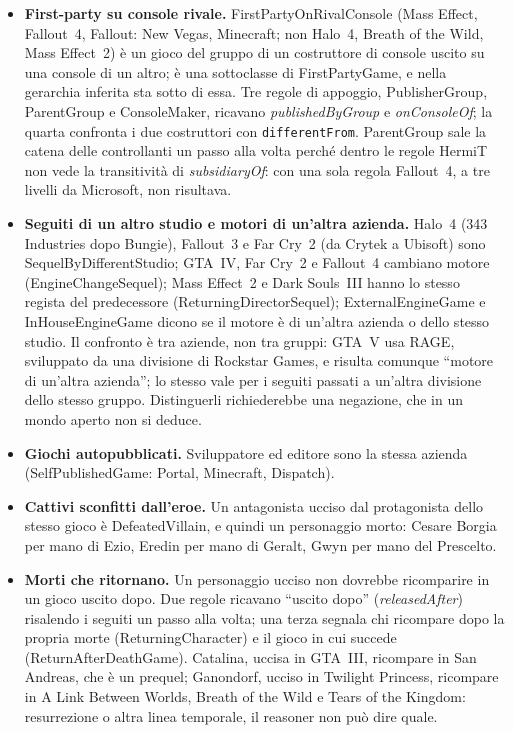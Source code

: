 \documentclass[10pt,a4paper]{article}
\newcommand{\cls}[1]{\textsf{#1}}
\newcommand{\prop}[1]{\textit{#1}}
\begin{document}
\begin{itemize}
  \item \textbf{First-party su console rivale.} \cls{FirstPartyOnRivalConsole} (Mass Effect, Fallout~4, Fallout: New Vegas, Minecraft; non Halo~4, Breath of the Wild, Mass Effect~2) è un gioco del gruppo di un costruttore di console uscito su una console di un altro; è una sottoclasse di \cls{FirstPartyGame}, e nella gerarchia inferita sta sotto di essa. Tre regole di appoggio, \textsf{PublisherGroup}, \textsf{ParentGroup} e \textsf{ConsoleMaker}, ricavano \prop{publishedByGroup} e \prop{onConsoleOf}; la quarta confronta i due costruttori con \texttt{differentFrom}. \textsf{ParentGroup} sale la catena delle controllanti un passo alla volta perché dentro le regole HermiT non vede la transitività di \prop{subsidiaryOf}: con una sola regola Fallout~4, a tre livelli da Microsoft, non risultava.
  \item \textbf{Seguiti di un altro studio e motori di un'altra azienda.} Halo~4 (343 Industries dopo Bungie), Fallout~3 e Far Cry~2 (da Crytek a Ubisoft) sono \cls{SequelByDifferentStudio}; GTA~IV, Far Cry~2 e Fallout~4 cambiano motore (\cls{EngineChangeSequel}); Mass Effect~2 e Dark Souls~III hanno lo stesso regista del predecessore (\cls{ReturningDirectorSequel}); \cls{ExternalEngineGame} e \cls{InHouseEngineGame} dicono se il motore è di un'altra azienda o dello stesso studio. Il confronto è tra aziende, non tra gruppi: GTA~V usa RAGE, sviluppato da una divisione di Rockstar Games, e risulta comunque ``motore di un'altra azienda''; lo stesso vale per i seguiti passati a un'altra divisione dello stesso gruppo. Distinguerli richiederebbe una negazione, che in un mondo aperto non si deduce.
  \item \textbf{Giochi autopubblicati.} Sviluppatore ed editore sono la stessa azienda (\cls{SelfPublishedGame}: Portal, Minecraft, Dispatch).
  \item \textbf{Cattivi sconfitti dall'eroe.} Un antagonista ucciso dal protagonista dello stesso gioco è \cls{DefeatedVillain}, e quindi un personaggio morto: Cesare Borgia per mano di Ezio, Eredin per mano di Geralt, Gwyn per mano del Prescelto.
  \item \textbf{Morti che ritornano.} Un personaggio ucciso non dovrebbe ricomparire in un gioco uscito dopo. Due regole ricavano ``uscito dopo'' (\prop{releasedAfter}) risalendo i seguiti un passo alla volta; una terza segnala chi ricompare dopo la propria morte (\cls{ReturningCharacter}) e il gioco in cui succede (\cls{ReturnAfterDeathGame}). Catalina, uccisa in GTA~III, ricompare in San Andreas, che è un prequel; Ganondorf, ucciso in Twilight Princess, ricompare in A Link Between Worlds, Breath of the Wild e Tears of the Kingdom: resurrezione o altra linea temporale, il reasoner non può dire quale.
\end{itemize}
\end{document}
